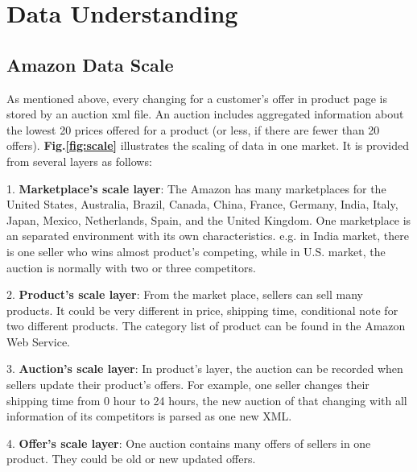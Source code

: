 \section{Data Understanding}
\label{sec:DataUnderstanding}


\subsection{Amazon Data Scale}
\label{sec:amzScale}

As mentioned above, every changing for a customer's offer in product page is stored by an auction xml file. An auction includes aggregated information about the lowest 20 prices offered for a product (or less, if there are fewer than 20 offers).  \textbf{Fig.\ref{fig:scale}} illustrates the scaling of data in one market. It is provided from several layers as follows:

1. \textbf{Marketplace's scale layer}: The Amazon has many marketplaces for
the United States, Australia, Brazil, Canada, China, France, Germany, India, Italy, Japan, Mexico, Netherlands, Spain, and the United Kingdom. One marketplace is an separated  environment with its own characteristics.  e.g. in India market, there is one seller who wins almost product's competing, while in U.S. market, the auction is normally with two or three competitors.

2. \textbf{Product's scale layer}: From the market place, sellers can sell many products. It could be very different in price, shipping time, conditional note for two different products. The category list of product can be found in the Amazon Web Service.

3. \textbf{Auction's scale layer}: In product's layer, the auction can be recorded when sellers update their product's offers. For example, one seller changes their shipping time from 0 hour to 24 hours, the new auction of that changing with all information of its competitors is parsed as one new XML.

4. \textbf{Offer's scale layer}: One auction contains many offers of sellers in one product. They could be old or new updated offers.


